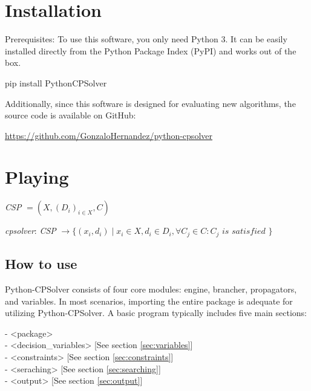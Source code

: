 \documentclass{article}
\newcommand{\definition}[1] {
    \begin{tcolorbox}[colback=white,colframe=mygray,sharp corners=all,top=0.01cm,bottom=0.01cm,left=0.1cm]
        {\fontfamily{pcr}\selectfont #1}
    \end{tcolorbox}
}
\newcommand{\code}[1] {
    \begin{tcolorbox}[colback=mygray,colframe=mygray,sharp corners=all,top=0.01cm,bottom=0.01cm,left=0.1cm]
        \small
        {\fontfamily{pcr}\selectfont
        #1
        }

    \end{tcolorbox}
}
\begin{document}
\section{Installation}

Prerequisites: To use this software, you only need Python 3. It can be easily installed directly from the Python Package Index (PyPI) and works out of the box.

\code{pip install PythonCPSolver}

Additionally, since this software is designed for evaluating new algorithms, the source code is available on GitHub:

\href{https://github.com/GonzaloHernandez/python-cpsolver}{https://github.com/GonzaloHernandez/python-cpsolver}

\section{Playing}

\textit{CSP} $ = (X,(D_i)_{i \in X},C)$ \cite{apt:2003}

\textit{cpsolver}: \textit{CSP} $ \rightarrow \{(x_i,d_i) \mid x_i \in X, d_i \in D_i, \forall C_j \in C : C_j \textit{ is satisfied }\}$

\subsection{How to use}

Python-CPSolver consists of four core modules: engine, brancher, propagators, and variables. In most scenarios, importing the entire package is adequate for utilizing Python-CPSolver. A basic program typically includes five main sections: \\

\definition{ 
    - <package> \\
    - <decision\_variables> {\footnotesize [See section \ref{sec:variables}]}\\
    - <constraints> {\footnotesize [See section \ref{sec:constraints}]}\\
    - <seraching> {\footnotesize [See section \ref{sec:searching}]}\\
    - <output> {\footnotesize [See section \ref{sec:output}]}
}
\end{document}
